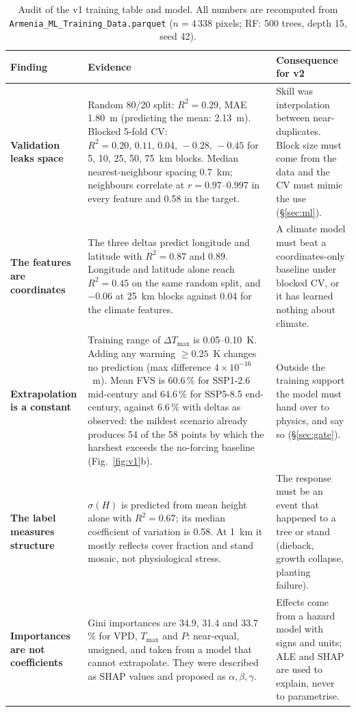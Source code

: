 \begin{table}[t]
\centering
\caption{Audit of the v1 training table and model. All numbers are recomputed from \texttt{Armenia\_ML\_Training\_Data.parquet} ($n=4\,338$ pixels; RF: 500 trees, depth 15, seed 42).}\label{tab:audit}
\footnotesize
\renewcommand{\arraystretch}{1.1}
\begin{tabularx}{\linewidth}{@{}>{\raggedright\arraybackslash\bfseries\sffamily}p{2.55cm}>{\raggedright\arraybackslash}X>{\raggedright\arraybackslash}p{4.6cm}@{}}
\toprule
Finding & Evidence & Consequence for v2\\
\midrule
Validation leaks space & Random 80/20 split: $R^2=0.29$, MAE 1.80~m (predicting the mean: 2.13~m). Blocked 5-fold CV: $R^2=0.20,\,0.11,\,0.04,\,-0.28,\,-0.45$ for 5, 10, 25, 50, 75~km blocks. Median nearest-neighbour spacing 0.7~km; neighbours correlate at $r=0.97$--$0.997$ in every feature and 0.58 in the target. & Skill was interpolation between near-duplicates. Block size must come from the data and the CV must mimic the use (\S\ref{sec:ml}).\\
The features are coordinates & The three deltas predict longitude and latitude with $R^2=0.87$ and $0.89$. Longitude and latitude alone reach $R^2=0.45$ on the same random split, and $-0.06$ at 25~km blocks against 0.04 for the climate features. & A climate model must beat a coordinates-only baseline under blocked CV, or it has learned nothing about climate.\\
Extrapolation is a constant & Training range of $\Delta T_{\max}$ is 0.05--0.10~K. Adding any warming $\ge 0.25$~K changes no prediction (max difference $4\times10^{-16}$~m). Mean FVS is 60.6\,\% for SSP1-2.6 mid-century and 64.6\,\% for SSP5-8.5 end-century, against 6.6\,\% with deltas as observed: the mildest scenario already produces 54 of the 58 points by which the harshest exceeds the no-forcing baseline (Fig.~\ref{fig:v1}b). & Outside the training support the model must hand over to physics, and say so (\S\ref{sec:gate}).\\
The label measures structure & $\sigma(H)$ is predicted from mean height alone with $R^2=0.67$; its median coefficient of variation is 0.58. At 1~km it mostly reflects cover fraction and stand mosaic, not physiological stress. & The response must be an event that happened to a tree or stand (dieback, growth collapse, planting failure).\\
Importances are not coefficients & Gini importances are 34.9, 31.4 and 33.7\,\% for VPD, $T_{\max}$ and $P$: near-equal, unsigned, and taken from a model that cannot extrapolate. They were described as SHAP values and proposed as $\alpha,\beta,\gamma$. & Effects come from a hazard model with signs and units; ALE and SHAP are used to explain, never to parametrise.\\

\end{tabularx}
\end{table}
